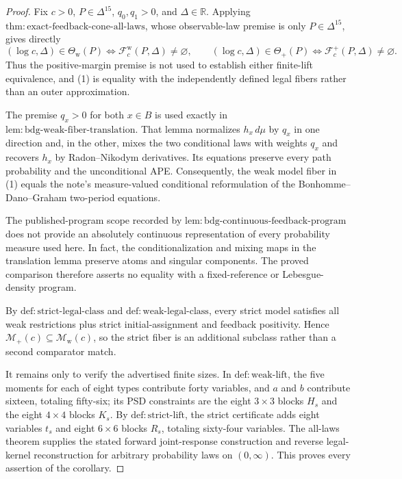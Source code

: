 \documentclass{article}
\begin{document}
\begin{proof}
Fix \(c>0\), \(P\in\Delta^{15}\), \(q_0,q_1>0\), and \(\Delta\in\mathbb R\).  Applying \(\mathrm{thm{:}exact\text{-}feedback\text{-}cone\text{-}all\text{-}laws}\), whose observable-law premise is only \(P\in\Delta^{15}\), gives directly
\[
 (\log c,\Delta)\in\Theta_{\mathrm w}(P)
 \Longleftrightarrow \mathcal F_c^{\mathrm w}(P,\Delta)\ne\varnothing,
 \qquad
 (\log c,\Delta)\in\Theta_+(P)
 \Longleftrightarrow \mathcal F_c^+(P,\Delta)\ne\varnothing. \tag{1}
\]
Thus the positive-margin premise is not used to establish either finite-lift equivalence, and (1) is equality with the independently defined legal fibers rather than an outer approximation.

The premise \(q_x>0\) for both \(x\in B\) is used exactly in \(\mathrm{lem{:}bdg\text{-}weak\text{-}fiber\text{-}translation}\).  That lemma normalizes \(h_x\,d\mu\) by \(q_x\) in one direction and, in the other, mixes the two conditional laws with weights \(q_x\) and recovers \(h_x\) by Radon--Nikodym derivatives.  Its equations preserve every path probability and the unconditional APE.  Consequently, the weak model fiber in (1) equals the note's measure-valued conditional reformulation of the Bonhomme--Dano--Graham two-period equations.

The published-program scope recorded by \(\mathrm{lem{:}bdg\text{-}continuous\text{-}feedback\text{-}program}\) does not provide an absolutely continuous representation of every probability measure used here.  In fact, the conditionalization and mixing maps in the translation lemma preserve atoms and singular components.  The proved comparison therefore asserts no equality with a fixed-reference or Lebesgue-density program.

By \(\mathrm{def{:}strict\text{-}legal\text{-}class}\) and \(\mathrm{def{:}weak\text{-}legal\text{-}class}\), every strict model satisfies all weak restrictions plus strict initial-assignment and feedback positivity.  Hence \(\mathcal M_+(c)\subseteq\mathcal M_{\mathrm w}(c)\), so the strict fiber is an additional subclass rather than a second comparator match.

It remains only to verify the advertised finite sizes.  In \(\mathrm{def{:}weak\text{-}lift}\), the five moments for each of eight types contribute forty variables, and \(a\) and \(b\) contribute sixteen, totaling fifty-six; its PSD constraints are the eight \(3\times3\) blocks \(H_s\) and the eight \(4\times4\) blocks \(K_s\).  By \(\mathrm{def{:}strict\text{-}lift}\), the strict certificate adds eight variables \(t_s\) and eight \(6\times6\) blocks \(R_s\), totaling sixty-four variables.  The all-laws theorem supplies the stated forward joint-response construction and reverse legal-kernel reconstruction for arbitrary probability laws on \((0,\infty)\).  This proves every assertion of the corollary.
\end{proof}
\end{document}
